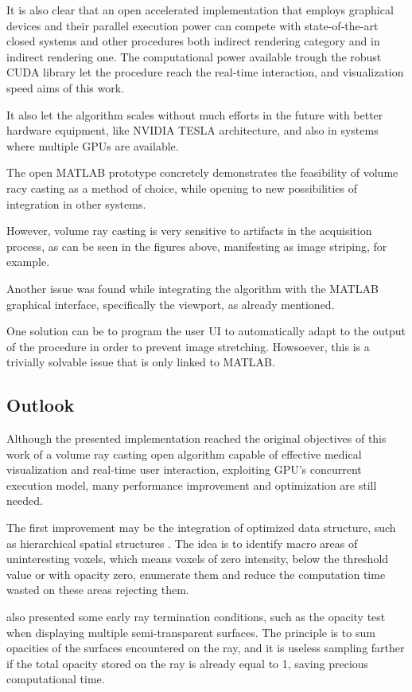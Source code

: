 \documentclass[12pt,a4paper]{extarticle}
\newcommand{\linespace}{\vspace{8pt}}
\begin{document}
It is also clear that an open accelerated implementation that employs graphical devices and their parallel execution power can compete with state-of-the-art closed systems and other procedures both indirect rendering category and in indirect rendering one.
The computational power available trough the robust CUDA library let the procedure reach the real-time interaction, and visualization speed aims of this work.

It also let the algorithm scales without much efforts in the future with better hardware equipment, like NVIDIA TESLA architecture, and also in systems where multiple GPUs are available. 
\linespace

The open MATLAB prototype concretely demonstrates the feasibility of volume racy casting as a method of choice, while opening to new possibilities of integration in other systems.
\linespace

However, volume ray casting is very sensitive to artifacts in the acquisition process, as can be seen in the figures above, manifesting as image striping, for example. 
\linespace

Another issue was found while integrating the algorithm with the MATLAB graphical interface, specifically the viewport, as already mentioned.

One solution can be to program the user UI to automatically adapt to the output of the procedure in order to prevent image stretching. Howsoever, this is a trivially solvable issue that is only linked to MATLAB.
\subsection{Outlook}
Although the presented implementation reached the original objectives of this work of a volume ray casting open algorithm capable of effective medical visualization and real-time user interaction, exploiting GPU's concurrent execution model, many performance improvement and optimization are still needed.
\linespace

The first improvement may be the integration of optimized data structure, such as hierarchical spatial structures \cite{levoy_1990:5}. The idea is to identify macro areas of uninteresting voxels, which means voxels of zero intensity, below the threshold value or with opacity zero, enumerate them and reduce the computation time wasted on these areas rejecting them.

\cite{levoy_1990:5} also presented some early ray termination conditions, such as the opacity test when displaying multiple semi-transparent surfaces. The principle is to sum opacities of the surfaces encountered on the ray, and it is useless sampling farther if the total opacity stored on the ray is already equal to 1, saving precious computational time.
\linespace
\end{document}
